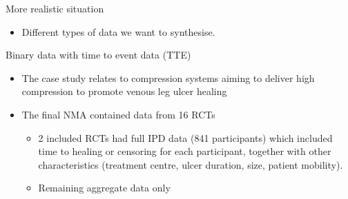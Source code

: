 \documentclass[
  ignorenonframetext,
]{beamer}
\providecommand{\tightlist}{%
  \setlength{\itemsep}{0pt}\setlength{\parskip}{0pt}}\usepackage{longtable,booktabs,array}
\begin{document}
\begin{frame}{More realistic situation}
\protect\hypertarget{more-realistic-situation}{}
\begin{itemize}
\tightlist
\item
  Different types of data we want to synthesise.
\end{itemize}
\end{frame}

\begin{frame}{Binary data with time to event data (TTE)}
\protect\hypertarget{binary-data-with-time-to-event-data-tte}{}

\pause

\begin{itemize}
\tightlist
\item
  The case study relates to compression systems aiming to deliver high
  compression to promote venous leg ulcer healing
\end{itemize}

\pause

\begin{itemize}
\tightlist
\item
  The final NMA contained data from 16 RCTs

  \begin{itemize}
  \tightlist
  \item
    2 included RCTs had full IPD data (841 participants) which included
    time to healing or censoring for each participant, together with
    other characteristics (treatment centre, ulcer duration, size,
    patient mobility).
  \item
    Remaining aggregate data only
  \end{itemize}
\end{itemize}

\marginnote{\begin{footnotesize}

\end{footnotesize}}
\end{frame}
\end{document}
